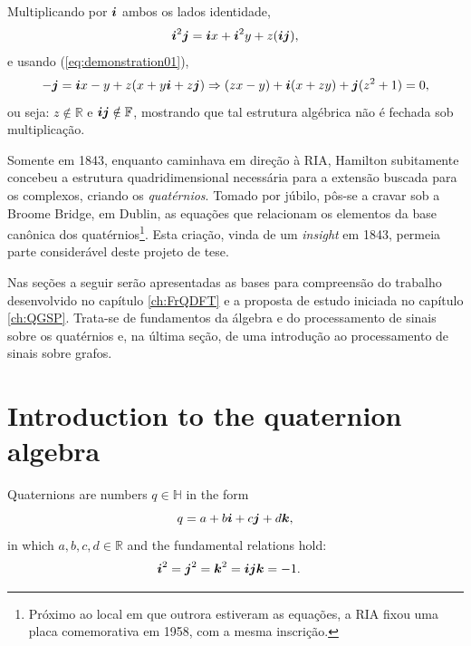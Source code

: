 Multiplicando por $\boldsymbol{i}$ ambos os lados identidade,
\begin{equation}
\boldsymbol{i}^2 \boldsymbol{j} = \boldsymbol{i} x + \boldsymbol{i}^2 y + z (\boldsymbol{i} \boldsymbol{j}),
\end{equation}
e usando (\ref{eq:demonstration01}),
\begin{equation}
- \boldsymbol{j} = \boldsymbol{i} x - y + z (x + y \boldsymbol{i} + z \boldsymbol{j})
\Rightarrow
(zx - y) + \boldsymbol{i} (x + zy) + \boldsymbol{j} (z^2 + 1) = 0,
\end{equation}
ou seja: $z \notin \mathbb{R}$ e $ \boldsymbol{i} \boldsymbol{j} \notin \mathbb{F} $, mostrando que tal estrutura alg\'ebrica n\~ao \'e fechada sob multiplica\c c\~ao.

Somente em 1843, enquanto caminhava em dire\c c\~ao \`a RIA, Hamilton subitamente concebeu a estrutura quadridimensional necess\'aria para a extens\~ao buscada para os complexos, criando os \emph{quat\'ernios}. Tomado por j\'ubilo, p\^os-se a cravar sob a Broome Bridge, em Dublin, as equa\c c\~oes que relacionam os elementos da base can\^onica dos quat\'ernios\footnote{Pr\'oximo ao local em que outrora estiveram as equa\c c\~oes, a RIA fixou uma placa comemorativa em 1958, com a mesma inscri\c c\~ao.}. Esta cria\c c\~ao, vinda de um \emph{insight} em 1843, permeia parte consider\'avel deste projeto de tese.


Nas se\c c\~oes a seguir ser\~ao apresentadas as bases para compreens\~ao do trabalho desenvolvido no cap\'itulo \ref{ch:FrQDFT} e a proposta de estudo iniciada no cap\'itulo \ref{ch:QGSP}. Trata-se de fundamentos da \'algebra e do processamento de sinais sobre os quat\'ernios e, na \'ultima se\c c\~ao, de uma introdu\c c\~ao ao processamento de sinais sobre grafos.


\section{Introduction to the quaternion algebra}

Quaternions are numbers $q \in \mathbb{H}$ in the form
\begin{equation}
q = a + b\boldsymbol{i} + c\boldsymbol{j} + d\boldsymbol{k},
\label{eq:q}
\end{equation}
in which $a, b, c, d \in \mathbb{R}$ and the fundamental relations hold:
\begin{equation}
\label{eq:fund_rel}
\begin{aligned}
\boldsymbol{i} ^2 = \boldsymbol{j}^2 &=\boldsymbol{k}^2 = \boldsymbol{i} \boldsymbol{j} \boldsymbol{k} = -1.
\end{aligned}
\end{equation}

